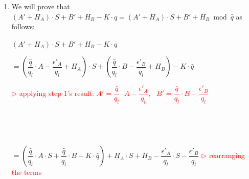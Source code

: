 \begin{enumerate}
$(\hat{A}\cdot S + \hat{B} \bmod \hat{q}) \bmod t$

$= ((A' + H_A)\cdot S + B' + H_B \bmod \hat{q}) \bmod t$

$= M$ \textcolor{red}{ $\rhd$ i.e., $(\hat{A}, \hat{B}) = (A' + H_A, B' + H_B) \bmod \hat{q}$ is a valid ciphertext that decrypts to $M$}

$ $

\item We will prove that $(A' + H_A)\cdot S + B' + H_B - K\cdot \hat{q} = (A' + H_A)\cdot S + B' + H_B \bmod \hat{q}$ as follows: 

$(A' + H_A)\cdot S + B' + H_B - K\cdot \hat{q}$ 


$ = (\dfrac{\hat{q}}{q_{l}}\cdot A - \dfrac{\epsilon'_A}{q_{l}} + H_A)\cdot S + (\dfrac{\hat{q}}{q_{l}}\cdot B - \dfrac{\epsilon'_B}{q_{l}} + H_B) - K\cdot \hat{q}$ 

\textcolor{red}{ $\rhd$ applying step 1's result: $A' = \dfrac{\hat{q}}{q_{l}}\cdot A - \dfrac{\epsilon'_A}{q_{l}}, \text{ } B' = \dfrac{\hat{q}}{q_{l}}\cdot B - \dfrac{\epsilon'_B}{q_{l}}$}

$ $

$ $

$ = \left(\dfrac{\hat{q}}{q_{l}}\cdot A\cdot S + \dfrac{\hat{q}}{q_{l}}\cdot B  - K\cdot \hat{q}\right) + H_A\cdot S + H_B - \dfrac{\epsilon'_A}{q_{l}}\cdot S - \dfrac{\epsilon'_B}{q_{l}}$ \textcolor{red}{ $\rhd$ rearranging the terms}


\end{enumerate}
